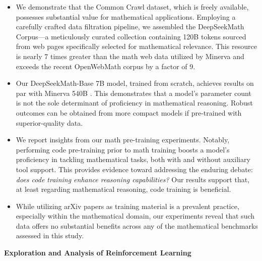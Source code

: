 \begin{itemize}[topsep=0pt]
    \item We demonstrate that the Common Crawl dataset, which is freely available, possesses substantial value for mathematical applications. Employing a carefully crafted data filtration pipeline, we assembled the DeepSeekMath Corpus—a meticulously curated collection containing 120B tokens sourced from web pages specifically selected for mathematical relevance. This resource is nearly 7 times greater than the math web data utilized by Minerva \citep{minerva} and exceeds the recent OpenWebMath corpus \citep{openwebmath} by a factor of 9.

    \item Our DeepSeekMath-Base 7B model, trained from scratch, achieves results on par with Minerva 540B \citep{minerva}. This demonstrates that a model's parameter count is not the sole determinant of proficiency in mathematical reasoning. Robust outcomes can be obtained from more compact models if pre-trained with superior-quality data.

    \item We report insights from our math pre-training experiments. Notably, performing code pre-training prior to math training boosts a model’s proficiency in tackling mathematical tasks, both with and without auxiliary tool support. This provides evidence toward addressing the enduring debate: \textit{does code training enhance reasoning capabilities?} Our results support that, at least regarding mathematical reasoning, code training is beneficial.

    \item While utilizing arXiv papers as training material is a prevalent practice, especially within the mathematical domain, our experiments reveal that such data offers no substantial benefits across any of the mathematical benchmarks assessed in this study.
\end{itemize}

\textbf{Exploration and Analysis of Reinforcement Learning}

